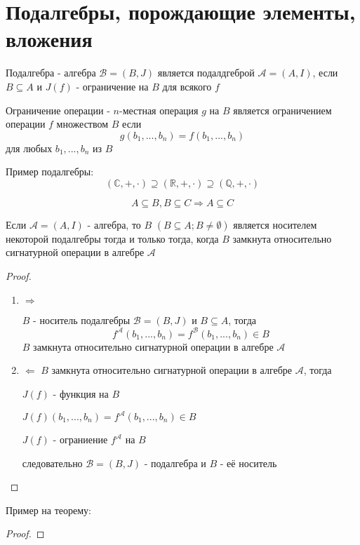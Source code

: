 \documentclass[../main/document.tex]{subfiles}
\begin{document}
\section{Подалгебры, порождающие элементы, вложения}
\begin{dfn}
Подалгебра - алгебра $\mathcal{B}=(B,J)$ является подалдгеброй $\mathcal{A}=(A,I)$, если $B\subseteq A$ и $J(f)$ - ограничение на $B$ для всякого $f$
\end{dfn}
\begin{dfn}
Ограничение операции - $n$-местная операция $g$ на $B$ является ограничением операции $f$ множеством $B$ если 
$$g(b_1,...,b_n)=f(b_1,...,b_n)$$
для любых $b_1,...,b_n$ из $B$
\end{dfn}
\begin{exm}
Пример подалгебры:
$$(\mathbb{C},+,\cdot)\supseteq (\mathbb{R},+,\cdot)\supseteq (\mathbb{Q},+,\cdot)$$
\end{exm}
\begin{cnsq}
$$A\subseteq B, B\subseteq C \Rightarrow A\subseteq C$$
\end{cnsq}
\begin{thm}
Если $\mathcal{A}=(A,I)$ - алгебра, то $B$ $(B\subseteq A; B\neq \emptyset)$ является носителем некоторой подалгебры тогда и только тогда, когда $B$ замкнута относительно сигнатурной операции в алгебре $\mathcal{A}$
\begin{proof}
\begin{enumerate}
\item $\Rightarrow$

$B$ - носитель подалгебры $\mathcal{B}=(B,J)$ и $B\subseteq A$, тогда
$$f^{\mathcal{A}}(b_1,...,b_n)=f^{\mathcal{B}}(b_1,...,b_n)\in B$$
$B$ замкнута относительно сигнатурной операции в алгебре $\mathcal{A}$
\item $\Leftarrow$
$B$ замкнута относительно сигнатурной операции в алгебре $\mathcal{A}$, тогда

$J(f)$ - функция на $B$

$J(f)(b_1,...,b_n)=f^{\mathcal{A}}(b_1,...,b_n)\in B$

$J(f)$ - ограниение $f^{\mathcal{A}}$  на $B$

следовательно $\mathcal{B}=(B,J)$ - подалгебра и $B$ - её носитель
\end{enumerate}
\end{proof}
\end{thm}
\begin{exm}
Пример на теорему:

\end{exm}

\begin{thm}
\begin{proof}

\end{proof}
\end{thm}
\end{document}
